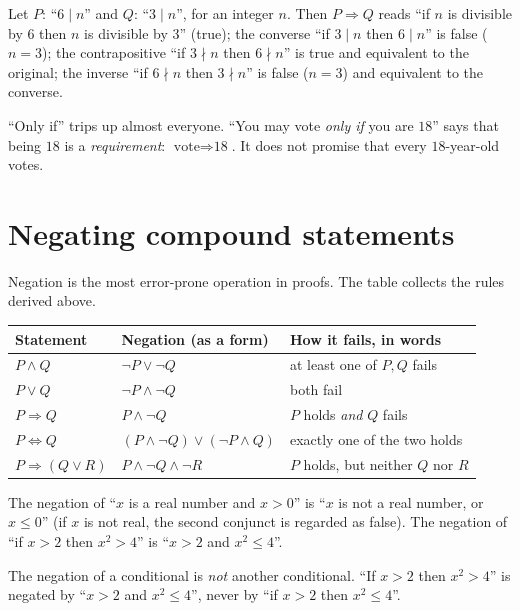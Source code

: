 \begin{example}\label{ex:6-3}
	Let $P$: ``$6\mid n$'' and $Q$: ``$3\mid n$'', for an integer $n$. Then $P\Rightarrow Q$ reads ``if $n$ is divisible by $6$ then $n$ is divisible by $3$'' (true); the converse ``if $3\mid n$ then $6\mid n$'' is false ($n=3$); the contrapositive ``if $3\nmid n$ then $6\nmid n$'' is true and equivalent to the original; the inverse ``if $6\nmid n$ then $3\nmid n$'' is false ($n=3$) and equivalent to the converse.
\end{example}

\begin{intuition}
	``Only if'' trips up almost everyone. ``You may vote \emph{only if} you are $18$'' says that being $18$ is a \emph{requirement}: $\text{vote}\Rightarrow\text{18}$. It does not promise that every $18$-year-old votes.
\end{intuition}

\section{Negating compound statements}

Negation is the most error-prone operation in proofs. The table collects the rules derived above.

\begin{center}
	\begin{tabular}{@{}p{4cm}p{5.2cm}p{5.3cm}@{}}
		\toprule
		\textbf{Statement} & \textbf{Negation (as a form)} & \textbf{How it fails, in words}\\
		\midrule
		$P\wedge Q$ & $\neg P\vee\neg Q$ & at least one of $P,Q$ fails\\
		$P\vee Q$ & $\neg P\wedge\neg Q$ & both fail\\
		$P\Rightarrow Q$ & $P\wedge\neg Q$ & $P$ holds \emph{and} $Q$ fails\\
		$P\Leftrightarrow Q$ & $(P\wedge\neg Q)\vee(\neg P\wedge Q)$ & exactly one of the two holds\\
		$P\Rightarrow(Q\vee R)$ & $P\wedge\neg Q\wedge\neg R$ & $P$ holds, but neither $Q$ nor $R$\\
		\bottomrule
	\end{tabular}
\end{center}

\begin{example}
	The negation of ``$x$ is a real number and $x>0$'' is ``$x$ is not a real number, or $x\le 0$'' (if $x$ is not real, the second conjunct is regarded as false). The negation of ``if $x>2$ then $x^2>4$'' is ``$x>2$ and $x^2\le4$''.
\end{example}

\begin{warning}
	The negation of a conditional is \emph{not} another conditional. ``If $x>2$ then $x^2>4$'' is negated by ``$x>2$ and $x^2\le 4$'', never by ``if $x>2$ then $x^2\le4$''.
\end{warning}